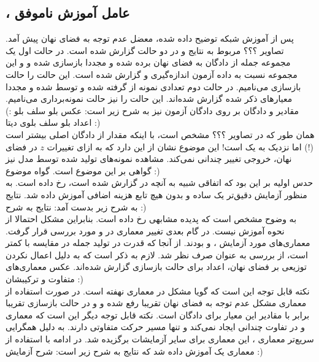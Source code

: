 	\subsection{\encoder{}،
		عامل آموزش ناموفق}
	پس از آموزش شبکه توضیح داده شده، معضل عدم توجه \decoder{} به فضای نهان پیش آمد. تصاویر ؟؟؟ مربوط به نتایج \bleu{} و \selfbleu{} در دو حالت گزارش شده است. در حالت اول یک مجموعه جمله از دادگان
	به فضای نهان برده شده و مجددا بازسازی ‌شده و \bleu{} و \selfbleu{} این مجموعه نسبت به داده آزمون اندازه‌گیری و گزارش شده است. این حالت را حالت بازسازی می‌نامیم. در حالت دوم تعدادی نمونه از \priordist{} گرفته شده و توسط \decoder{}
	\decode{}
	شده و مجددا معیارهای ذکر شده گزارش شده‌اند. این حالت را نیز حالت نمونه‌برداری می‌نامیم.
	مقادیر \bleu{} و \selfbleu{} دادگان \validation{} بر روی دادگان آزمون نیز به شرح زیر است:
	عکس بلو سلف بلو :)
	اعداد بلو سلف بلوی دیتا :)
	\\
	همان طور که در تصاویر ؟؟؟ مشخص است، با اینکه مقدار \bleu{} از دادگان اصلی بیشتر است (!) اما \selfbleu{} نزدیک به یک است! این موضوع نشان از این دارد که به ازای تغییرات $z$ در فضای نهان، خروجی \decoder{} تغییر چندانی نمی‌کند. مشاهده نمونه‌های تولید شده توسط مدل نیز گواهی بر این موضوع است.
	گواه موضوع :)
	\\
	حدس اولیه بر این بود که اتفاقی شبیه به آنچه در \vae{} گزارش شده است، رخ داده است. به منظور آزمایش دقیق‌تر یک \autoencoder{} ساده و بدون هیچ تابع هزینه اضافی آموزش داده شد. نتایج به شرح زیر بدست آمد:
	نتایج به شرح :)
	\\
	به وضوح مشخص است که پدیده مشابهی رخ داده است. بنابراین مشکل احتمالا از نحوه آموزش نیست. در گام بعدی تغییر معماری در \encoder{} و \decoder{} مورد بررسی قرار گرفت. معماری‌های مورد آزمایش ،  و   بودند. از آنجا که قدرت  در تولید جمله در مقایسه با  کمتر است، از بررسی  به عنوان \decoder{} صرف نظر شد. لازم به ذکر است که به دلیل اعمال نکردن توزیعی بر فضای نهان، اعداد برای حالت بازسازی گزارش شده‌اند.
	عکس معماری‌های متفاوت و ترکیبشان :)
	\\
	نکته قابل توجه این است که گویا مشکل در معماری \encoder{} نهفته است. در صورت استفاده از معماری \transformer{} مشکل عدم توجه به فضای نهان تقریبا رفع شده و \bleu{} و \selfbleu{} در حالت بازسازی تقریبا برابر با مقادیر این معیار برای دادگان \validation{} است. نکته قابل توجه دیگر این است که معماری \lstm{} و \transformer{} در \decoder{} تفاوت چندانی ایجاد نمی‌کند و تنها مسیر حرکت متفاوتی دارند.
	به دلیل همگرایی سریع‌تر معماری \transformer{}، این معماری برای سایر آزمایشات برگزیده شد. در ادامه با استفاده از معماری \transformer{} یک \wae{} آموزش داده شد که نتایج به شرح زیر است:
	شرح آزمایش :)
	\\
\fi
\iffalse
